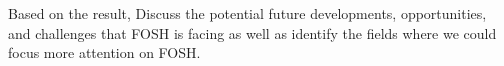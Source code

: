 \documentclass[final-report.tex]{subfiles}
\begin{document}
Based on the result, Discuss the potential future developments, opportunities, and challenges that FOSH is facing as well as identify the fields where we could focus more attention on FOSH.
\end{document}
